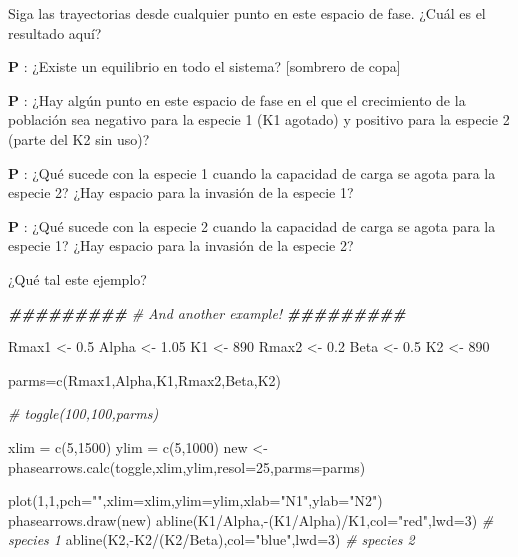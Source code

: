 \documentclass[
]{article}
\newenvironment{Shaded}{\begin{snugshade}}{\end{snugshade}}
\newcommand{\AttributeTok}[1]{\textcolor[rgb]{0.77,0.63,0.00}{#1}}
\newcommand{\CommentTok}[1]{\textcolor[rgb]{0.56,0.35,0.01}{\textit{#1}}}
\newcommand{\DecValTok}[1]{\textcolor[rgb]{0.00,0.00,0.81}{#1}}
\newcommand{\DocumentationTok}[1]{\textcolor[rgb]{0.56,0.35,0.01}{\textbf{\textit{#1}}}}
\newcommand{\FloatTok}[1]{\textcolor[rgb]{0.00,0.00,0.81}{#1}}
\newcommand{\FunctionTok}[1]{\textcolor[rgb]{0.00,0.00,0.00}{#1}}
\newcommand{\NormalTok}[1]{#1}
\newcommand{\OtherTok}[1]{\textcolor[rgb]{0.56,0.35,0.01}{#1}}
\newcommand{\SpecialCharTok}[1]{\textcolor[rgb]{0.00,0.00,0.00}{#1}}
\newcommand{\StringTok}[1]{\textcolor[rgb]{0.31,0.60,0.02}{#1}}
\begin{document}
Siga las trayectorias desde cualquier punto en este espacio de fase.
¿Cuál es el resultado aquí?

\textbf{P }: ¿Existe un equilibrio en todo el sistema? {[}sombrero de
copa{]}

\textbf{P }: ¿Hay algún punto en este espacio de fase en el que el
crecimiento de la población sea negativo para la especie 1 (K1 agotado)
y positivo para la especie 2 (parte del K2 sin uso)?

\textbf{P }: ¿Qué sucede con la especie 1 cuando la capacidad de carga
se agota para la especie 2? ¿Hay espacio para la invasión de la especie
1?

\textbf{P }: ¿Qué sucede con la especie 2 cuando la capacidad de carga
se agota para la especie 1? ¿Hay espacio para la invasión de la especie
2?

¿Qué tal este ejemplo?

\begin{Shaded}
\begin{Highlighting}[]
\DocumentationTok{\#\#\#\#\#\#\#\#\#}
\CommentTok{\# And another example!}
\DocumentationTok{\#\#\#\#\#\#\#\#\#}

\NormalTok{Rmax1 }\OtherTok{\textless{}{-}} \FloatTok{0.5}
\NormalTok{Alpha }\OtherTok{\textless{}{-}} \FloatTok{1.05}
\NormalTok{K1 }\OtherTok{\textless{}{-}} \DecValTok{890}
\NormalTok{Rmax2 }\OtherTok{\textless{}{-}} \FloatTok{0.2}
\NormalTok{Beta }\OtherTok{\textless{}{-}} \FloatTok{0.5}
\NormalTok{K2 }\OtherTok{\textless{}{-}} \DecValTok{890}

\NormalTok{parms}\OtherTok{=}\FunctionTok{c}\NormalTok{(Rmax1,Alpha,K1,Rmax2,Beta,K2)}

\CommentTok{\# toggle(100,100,parms)}

\NormalTok{xlim }\OtherTok{=} \FunctionTok{c}\NormalTok{(}\DecValTok{5}\NormalTok{,}\DecValTok{1500}\NormalTok{)}
\NormalTok{ylim }\OtherTok{=} \FunctionTok{c}\NormalTok{(}\DecValTok{5}\NormalTok{,}\DecValTok{1000}\NormalTok{)}
\NormalTok{new }\OtherTok{\textless{}{-}} \FunctionTok{phasearrows.calc}\NormalTok{(toggle,xlim,ylim,}\AttributeTok{resol=}\DecValTok{25}\NormalTok{,}\AttributeTok{parms=}\NormalTok{parms)}

\FunctionTok{plot}\NormalTok{(}\DecValTok{1}\NormalTok{,}\DecValTok{1}\NormalTok{,}\AttributeTok{pch=}\StringTok{""}\NormalTok{,}\AttributeTok{xlim=}\NormalTok{xlim,}\AttributeTok{ylim=}\NormalTok{ylim,}\AttributeTok{xlab=}\StringTok{"N1"}\NormalTok{,}\AttributeTok{ylab=}\StringTok{"N2"}\NormalTok{)}
\FunctionTok{phasearrows.draw}\NormalTok{(new)}
\FunctionTok{abline}\NormalTok{(K1}\SpecialCharTok{/}\NormalTok{Alpha,}\SpecialCharTok{{-}}\NormalTok{(K1}\SpecialCharTok{/}\NormalTok{Alpha)}\SpecialCharTok{/}\NormalTok{K1,}\AttributeTok{col=}\StringTok{"red"}\NormalTok{,}\AttributeTok{lwd=}\DecValTok{3}\NormalTok{)   }\CommentTok{\# species 1}
\FunctionTok{abline}\NormalTok{(K2,}\SpecialCharTok{{-}}\NormalTok{K2}\SpecialCharTok{/}\NormalTok{(K2}\SpecialCharTok{/}\NormalTok{Beta),}\AttributeTok{col=}\StringTok{"blue"}\NormalTok{,}\AttributeTok{lwd=}\DecValTok{3}\NormalTok{)   }\CommentTok{\# species 2}
\end{Highlighting}
\end{Shaded}
\end{document}
